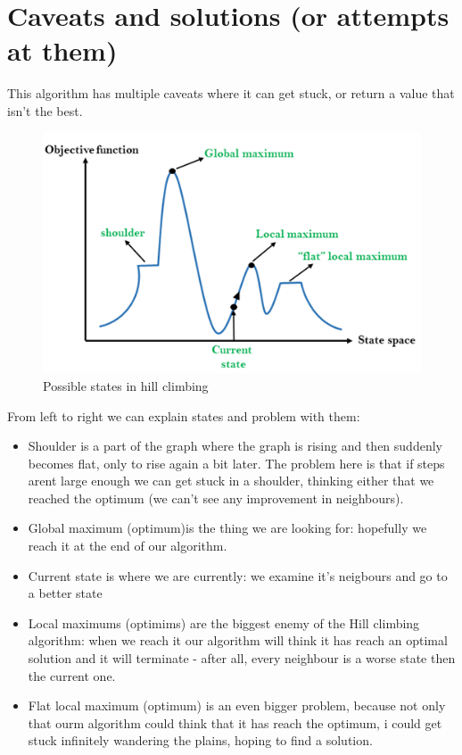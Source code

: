 \documentclass[10pt,a4paper]{article}
\begin{document}
	\section{Caveats and solutions (or attempts at them)}
		This algorithm has multiple caveats where it can get stuck, or return a value that isn't the best.
		\begin{figure}[h]
			\caption{Possible states in hill climbing}
			\includegraphics{hill_climbing_graph.png}
			\centering
		\end{figure}
		From left to right we can explain states and problem with them:
		\begin{itemize}
			\item Shoulder is a part of the graph where the graph is rising and then suddenly becomes flat, only to rise again a bit later. The problem here is that if steps arent large enough we can get stuck in a shoulder, thinking either that we reached the optimum (we can't see any improvement in neighbours).
			\item Global maximum (optimum)is the thing we are looking for: hopefully we reach it at the end of our algorithm.
			\item Current state is where we are currently: we examine it's neigbours and go to a better state
			\item Local maximums (optimims) are the biggest enemy of the Hill climbing algorithm: when we reach it our algorithm will think it has reach an optimal solution and it will terminate - after all, every neighbour is a worse state then the current one. 
			\item Flat local maximum (optimum) is an even bigger problem, because not only that ourm algorithm could think that it has reach the optimum, i could get stuck infinitely wandering the plains, hoping to find a solution.
		\end{itemize}
\end{document}
